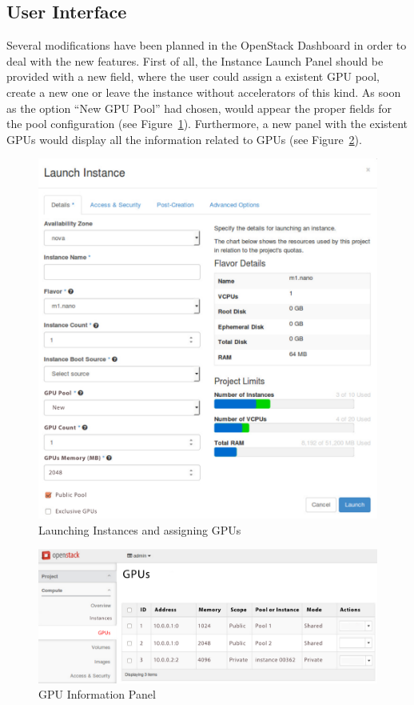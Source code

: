 \documentclass[a4paper,twoside]{article}
\begin{document}
\subsection{User Interface}
Several modifications have been planned in the OpenStack Dashboard in order to deal with the new features.
First of all, the Instance Launch Panel should be provided with a new field, where the user could assign a existent GPU pool, create a new one or leave the instance without accelerators of this kind.
As soon as the option ``New GPU Pool'' had chosen, would appear the proper fields for the pool configuration (see Figure~\ref{fig:ui-launch}).
Furthermore, a new panel with the existent GPUs would display all the information related to GPUs (see Figure~\ref{fig:ui-rgpus}).

\begin{figure}[!t]
  \centering
  \includegraphics[width=\linewidth]{images/UI-launch.pdf}
  \caption{Launching Instances and assigning GPUs}
  \label{fig:ui-launch}
\end{figure}
  
\begin{figure}[!t]
  \centering
  \includegraphics[width=\linewidth]{images/UI-rgpus.pdf}
  \caption{GPU Information Panel}
  \label{fig:ui-rgpus}
\end{figure}
\end{document}
